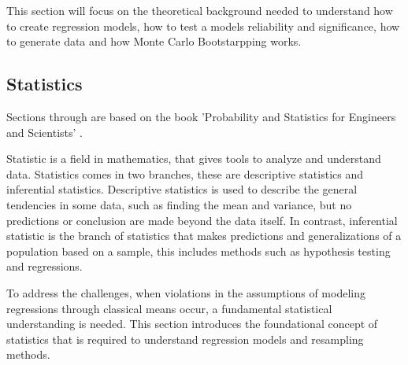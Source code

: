 This section will focus on the theoretical background needed to understand how to create regression models, how to test a models reliability and significance, how to generate data and how Monte Carlo Bootstarpping works.

\subsection{Statistics}
Sections through are based on the book 'Probability and Statistics for Engineers and Scientists' \cite{ProbAndStat}. \newline

\noindent Statistic is a field in mathematics, that gives tools to analyze and understand data. Statistics comes in two branches, these are descriptive statistics and inferential statistics. Descriptive statistics is used to describe the general tendencies in some data, such as finding the mean and variance, but no predictions or conclusion are made beyond the data itself. In contrast, inferential statistic is the branch of statistics that makes predictions and generalizations of a population based on a sample, this includes methods such as hypothesis testing and regressions. 

\noindent To address the challenges, when violations in the assumptions of modeling regressions through classical means occur, a fundamental statistical understanding is needed. This section introduces the foundational concept of statistics that is required to understand regression models and resampling methods.






\newpage

